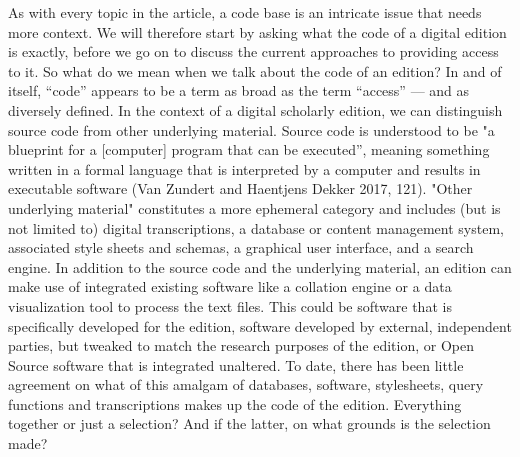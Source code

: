 \begin{paper}
As with every topic in the article, a code base is an intricate issue
that needs more context. We will therefore start by asking what the code
of a digital edition is exactly, before we go on to discuss the current
approaches to providing access to it. So what do we mean when we talk
about the code of an edition? In and of itself, ``code'' appears to be a
term as broad as the term ``access'' --- and as diversely defined. In the
context of a digital scholarly edition, we can distinguish source code
from other underlying material. Source code is understood to be "a
blueprint for a {[}computer{]} program that can be executed'', meaning
something written in a formal language that is interpreted by a computer
and results in executable software (Van Zundert and Haentjens Dekker
2017, 121). "Other underlying material" constitutes a more ephemeral
category and includes (but is not limited to) digital transcriptions, a
database or content management system, associated style sheets and
schemas, a graphical user interface, and a search engine. In addition to
the source code and the underlying material, an edition can make use of
integrated existing software like a collation engine or a data
visualization tool to process the text files. This could be software
that is specifically developed for the edition, software developed by
external, independent parties, but tweaked to match the research
purposes of the edition, or Open Source software that is integrated
unaltered. To date, there has been little agreement on what of this
amalgam of databases, software, stylesheets, query functions and
transcriptions makes up the code of the edition. Everything together or
just a selection? And if the latter, on what grounds is the selection
made?


\end{paper}
